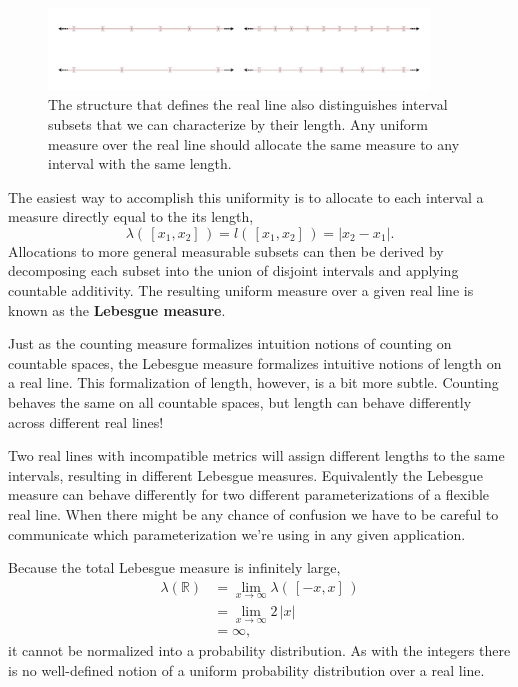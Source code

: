 \documentclass[
  letterpaper,
  DIV=11,
  numbers=noendperiod]{scrartcl}
\begin{document}
\begin{figure}

{\centering \includegraphics[width=0.9\textwidth,height=\textheight]{figures/interval_partitions/interval_partitions.pdf}

}

\caption{\label{fig-equal-length-intervals}The structure that defines
the real line also distinguishes interval subsets that we can
characterize by their length. Any uniform measure over the real line
should allocate the same measure to any interval with the same length.}

\end{figure}

The easiest way to accomplish this uniformity is to allocate to each
interval a measure directly equal to the its length, \[
\lambda( \, [x_{1}, x_{2}] \, )
= l( \, [x_{1}, x_{2}] \, )
= | x_{2} - x_{1} |.
\] Allocations to more general measurable subsets can then be derived by
decomposing each subset into the union of disjoint intervals and
applying countable additivity. The resulting uniform measure over a
given real line is known as the \textbf{Lebesgue measure}.

Just as the counting measure formalizes intuition notions of counting on
countable spaces, the Lebesgue measure formalizes intuitive notions of
length on a real line. This formalization of length, however, is a bit
more subtle. Counting behaves the same on all countable spaces, but
length can behave differently across different real lines!

Two real lines with incompatible metrics will assign different lengths
to the same intervals, resulting in different Lebesgue measures.
Equivalently the Lebesgue measure can behave differently for two
different parameterizations of a flexible real line. When there might be
any chance of confusion we have to be careful to communicate which
parameterization we're using in any given application.

Because the total Lebesgue measure is infinitely large, \begin{align*}
\lambda(\mathbb{R})
&=
\lim_{x \rightarrow \infty} \lambda( \, [-x, x] \, )
\\
&=
\lim_{x \rightarrow \infty} 2 \, | x |
\\
&=
\infty,
\end{align*} it cannot be normalized into a probability distribution. As
with the integers there is no well-defined notion of a uniform
probability distribution over a real line.
\end{document}
